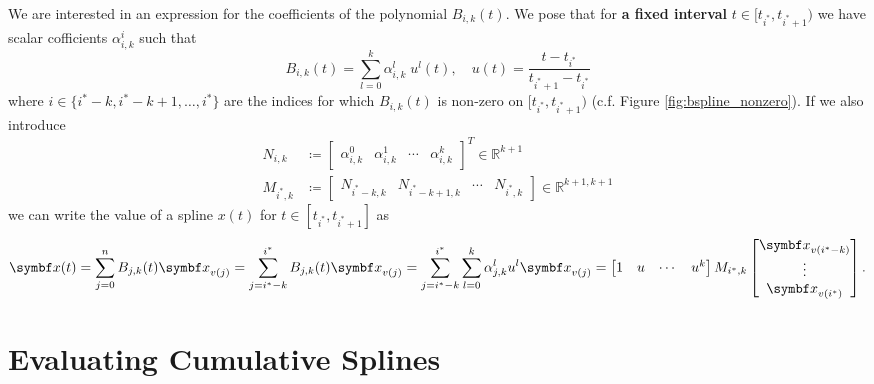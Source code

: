 We are interested in an expression for the coefficients of the polynomial $B_{i, k}(t)$. We pose that for \textbf{a fixed interval} $t \in [t_{i^*}, t_{i^*+1})$ we have scalar cofficients $\alpha^i_{i,k}$ such that
\begin{equation}
  \label{eq:basis_expression}
  B_{i, k}(t) = \sum_{l=0}^k \alpha^{l}_{i, k} \; u^l(t), \quad u(t) = \frac{t - t_{i^*}}{t_{i^*+1} - t_{i^*}}
\end{equation}
where $i \in \{ i^* - k, i^* - k + 1, \ldots, i^* \}$ are the indices for which $B_{i, k}(t)$ is non-zero on $[t_{i^*}, t_{i^*+1})$ (c.f. Figure \ref{fig:bspline_nonzero}). If we also introduce
\begin{equation}
  \label{eq:coeff_matrix_forms}
  \begin{aligned}
    N_{i, k}   & \coloneq \begin{bmatrix} \alpha_{i,k}^0 & \alpha_{i, k}^1 & \cdots & \alpha_{i, k}^k \end{bmatrix}^T \in \mathbb{R}^{k+1}    \\
    M_{i^*, k} & \coloneq \begin{bmatrix}
      N_{i^*-k, k} & N_{i^*-k+1, k} & \cdots & N_{i^*, k}
    \end{bmatrix} \in \mathbb{R}^{k+1, k+1}
  \end{aligned}
\end{equation}
we can write the value of a spline $x(t)$ for $t \in [t_{i^*}, t_{i^*+1}]$ as
\begin{equation}
  \begin{aligned}
    \x(t) = \sum_{j = 0}^n B_{j,k}(t) \x_{v(j)} = \sum_{j = i^*-k}^{i^*} B_{j,k}(t) \x_{v(j)} = \sum_{j = i^*-k}^{i^*} \sum_{l=0}^k \alpha_{j, k}^l u^l \x_{v(j)} =  \begin{bmatrix} 1 & u & \cdots & u^k \end{bmatrix} M_{i^*, k} \begin{bmatrix} \x_{v(i^* - k)} \\ \vdots \\ \x_{v(i^*)} \end{bmatrix}.
  \end{aligned}
\end{equation}

\section{Evaluating Cumulative Splines}

